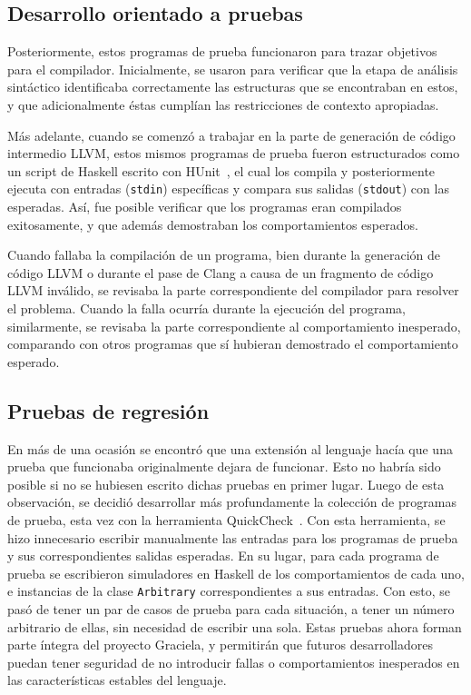 {{\subsection{Desarrollo orientado a pruebas}

Posteriormente, estos programas de prueba funcionaron para trazar objetivos para
el compilador. Inicialmente, se usaron para verificar que la etapa de análisis
sintáctico identificaba correctamente las estructuras que se  encontraban en
estos, y que adicionalmente éstas cumplían las restricciones de contexto
apropiadas.

Más adelante, cuando se comenzó a trabajar en la parte de generación de código
intermedio LLVM, estos mismos programas de prueba fueron estructurados como un
script de Haskell escrito con HUnit~\cite{hunit}, el cual los compila y
posteriormente ejecuta con entradas (\texttt{stdin}) específicas y compara sus
salidas (\texttt{stdout}) con las esperadas. Así, fue posible verificar que los
programas eran compilados exitosamente, y que además demostraban los
comportamientos esperados.

Cuando fallaba la compilación de un programa, bien durante la generación de
código LLVM o durante el pase de Clang a causa de un fragmento de código LLVM
inválido, se revisaba la parte correspondiente del compilador para resolver el
problema. Cuando la falla ocurría durante la ejecución del programa,
similarmente, se revisaba la parte correspondiente al comportamiento inesperado,
comparando con otros programas que sí hubieran  demostrado el comportamiento
esperado.

\subsection{Pruebas de regresión}

En más de una ocasión se encontró que una extensión al lenguaje hacía que una
prueba que funcionaba originalmente dejara de funcionar. Esto no habría sido
posible si no se hubiesen escrito dichas pruebas en primer lugar. Luego de esta
observación, se decidió desarrollar más profundamente la colección de programas
de prueba, esta vez con la herramienta QuickCheck~\cite{quickcheck}. Con esta
herramienta, se hizo innecesario escribir manualmente las entradas para los
programas de prueba y sus correspondientes salidas esperadas. En su lugar, para
cada programa de prueba se escribieron simuladores en Haskell de los
comportamientos de cada uno, e instancias de la clase \texttt{Arbitrary}
correspondientes a sus entradas. Con esto, se pasó de tener un par de casos de
prueba para cada situación, a tener un número arbitrario de ellas, sin necesidad
de escribir una sola. Estas pruebas ahora forman parte íntegra del proyecto
Graciela, y permitirán que futuros desarrolladores puedan tener seguridad de no
introducir fallas o comportamientos inesperados en las características estables
del lenguaje.

}}
